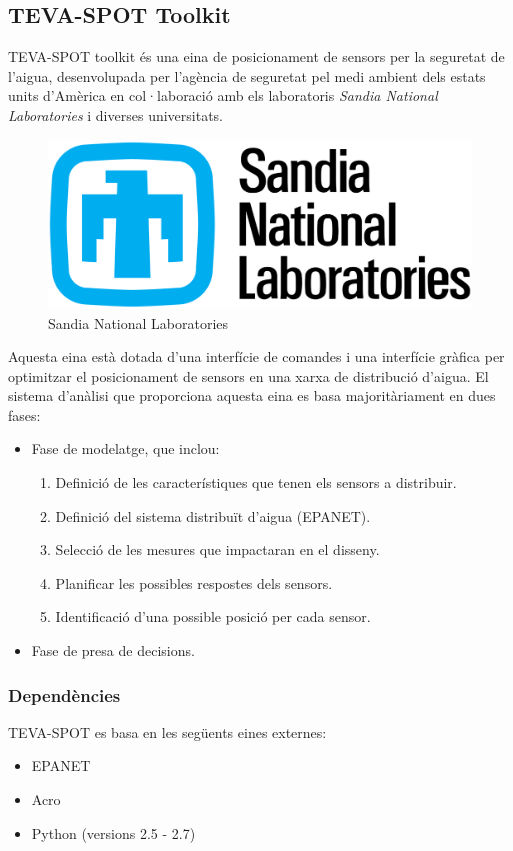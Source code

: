 \documentclass[12pt]{article}
\begin{document}
\subsection{TEVA-SPOT Toolkit}
TEVA-SPOT toolkit és una eina de posicionament de sensors per la seguretat de l'aigua, desenvolupada per l'agència de seguretat pel medi ambient dels estats units d'Amèrica en col·laboració amb els laboratoris \textit{Sandia National Laboratories} i diverses universitats.

\begin{figure}[h!]
	\centering
	\includegraphics[scale=0.3]{imatges/snlabs.png}
	\caption{Sandia National Laboratories}
\end{figure}

Aquesta eina està dotada d'una interfície de comandes i una interfície gràfica per optimitzar el posicionament de sensors en una xarxa de distribució d'aigua. El sistema d'anàlisi que proporciona aquesta eina es basa majoritàriament en dues fases:
\begin{itemize}
	\item Fase de modelatge, que inclou:
	\begin{enumerate}
		\item Definició de les característiques que tenen els sensors a distribuir.
		\item Definició del sistema distribuït d'aigua (EPANET).
		\item Selecció de les mesures que impactaran en el disseny.
		\item Planificar les possibles respostes dels sensors.
		\item Identificació d'una possible posició per cada sensor.
	\end{enumerate}
	\item Fase de presa de decisions.
\end{itemize}

\subsubsection{Dependències}
TEVA-SPOT es basa en les següents eines externes:
\begin{itemize}
	\item EPANET
	\item Acro
	\item Python (versions 2.5 - 2.7)
\end{itemize}
\end{document}
